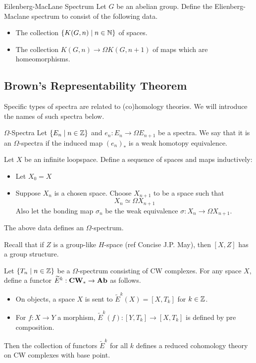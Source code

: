 \documentclass[a4paper]{article}
\begin{document}
\begin{defn}{Eilenberg-MacLane Spectrum}{} Let $G$ be an abelian group. Define the Elienberg-Maclane spectrum to consist of the following data. 
\begin{itemize}
\item The collection $\{K(G,n)\;|\;n\in\mathbb{N}\}$ of spaces. 
\item The collection $K(G,n)\to\Omega K(G,n+1)$ of maps which are homeomorphisms. 
\end{itemize}
\end{defn}

\subsection{Brown's Representability Theorem}
Specific types of spectra are related to (co)homology theories. We will introduce the names of such spectra below. 

\begin{defn}{$\Omega$-Spectra}{} Let $\{E_n\;|\;n\in\mathbb{Z}\}$ and $e_n:E_n\to\Omega E_{n+1}$ be a spectra. We say that it is an $\Omega$-spectra if the induced map $(e_n)_\ast$ is a weak homotopy equivalence. 
\end{defn}

\begin{lmm}{}{} Let $X$ be an infinite loopspace. Define a sequence of spaces and maps inductively:
\begin{itemize}
\item Let $X_0=X$
\item Suppose $X_n$ is a chosen space. Choose $X_{n+1}$ to be a space such that $$X_n\simeq\Omega X_{n+1}$$ Also let the bonding map $\sigma_n$ be the weak equivalence $\sigma:X_n\to\Omega X_{n+1}$. 
\end{itemize}
The above data defines an $\Omega$-spectrum. 
\end{lmm}

Recall that if $Z$ is a group-like $H$-space (ref Concise J.P. May), then $[X,Z]$ has a group structure. 

\begin{thm}{}{} Let $\{T_n\;|\;n\in\mathbb{Z}\}$ be a $\Omega$-spectrum consisting of CW complexes. For any space $X$, define a functor $\widetilde{E}^k:\bold{CW}_\ast\to\bold{Ab}$ as follows. 
\begin{itemize}
\item On objects, a space $X$ is sent to $\widetilde{E}^k(X)=[X,T_k]$ for $k\in\mathbb{Z}$.
\item For $f:X\to Y$ a morphism, $\widetilde{E}^k(f):[Y,T_k]\to[X,T_k]$ is defined by pre composition.
\end{itemize}
Then the collection of functors $\widetilde{E}^k$ for all $k$ defines a reduced cohomology theory on CW complexes with base point. 
\end{thm}
\end{document}
